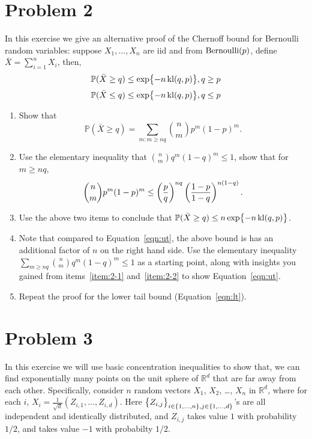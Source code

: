 \documentclass{article}
\DeclareMathOperator*{\kl}{{\rm kl}}
\DeclareMathOperator*{\Ber}{{\rm Bernoulli}}
\newcommand{\RR}{\mathbb{R}} %
\newcommand{\PP}{\mathbb{P}} %
\begin{document}
\section*{Problem 2}
In this exercise we give an alternative proof of the Chernoff bound for Bernoulli random
variables: suppose $X_1,\ldots,X_n$ are iid and from $\Ber(p)$, define
$\bar{X} = \sum_{i=1}^n X_i$, then,
\begin{equation}
  \PP( \bar{X} \geq q ) \leq \exp{-n \kl(q,p)}, q \geq p
  \label{eqn:ut}
\end{equation}
\begin{equation}
  \PP( \bar{X} \leq q ) \leq \exp{-n \kl(q,p)}, q \leq p
  \label{eqn:lt}
\end{equation}
\begin{enumerate}
\item Show that
\[ \PP( \bar{X} \geq q ) = \sum_{m: m \geq nq} {n \choose m} p^m (1-p)^m. \]
\label{item:2-1}
\item Use the elementary inequality that ${n \choose m} q^m (1-q)^m \leq 1$, show that for $m \geq nq$,
\[ {n \choose m} p^m (1-p)^m \leq \del{\frac{p}{q}}^{nq} \del{\frac{1-p}{1-q}}^{n(1-q)}. \]
\label{item:2-2}
\item Use the above two items to conclude that $\PP( \bar{X} \geq q ) \leq n \exp{-n \kl(q,p)}$.
\item Note that compared to Equation~\ref{eqn:ut}, the above bound is has an additional factor of $n$ on the right hand side.
Use the elementary inequality
 $\sum_{m \geq nq} {n \choose m} q^m (1-q)^m \leq 1$ as a starting point, along with insights you gained from
 items~\ref{item:2-1} and~\ref{item:2-2} to show Equation~\eqref{eqn:ut}.
\item Repeat the proof for the lower tail bound (Equation~\eqref{eqn:lt}).
\end{enumerate}

\section*{Problem 3}
In this exercise we will use basic concentration inequalities to show that,
we can find exponentially many points on the unit sphere of $\RR^d$ that are far away from each other.
Specifically, consider $n$ random vectors $X_1$, $X_2$, \ldots, $X_n$ in $\RR^d$,
where for each $i$, $X_i = \frac{1}{\sqrt{d}}(Z_{i,1}, \ldots, Z_{i,d})$. Here
$\cbr{Z_{i,j}}_{i \in \cbr{1,\ldots,n},j \in \cbr{1,\ldots,d}}$'s
are all independent and identically distributed, and $Z_{i,j}$ takes value $1$ with probability $1/2$, and takes value $-1$ with probabilty $1/2$.
\end{document}
